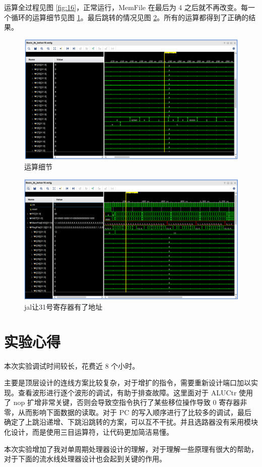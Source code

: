 \documentclass[a4paper,UTF8]{ctexart}
\begin{document}
运算全过程见图 \ref{fig:16}，正常运行，MemFile 在最后为 4 之后就不再改变。每一个循环的运算细节见图 \ref{fig:calcde}。最后跳转的情况见图 \ref{fig:cond}。所有的运算都得到了正确的结果。

\begin{figure}[H]
    \centering
    \includegraphics[width=\textwidth]{calcdetail.png}
    \caption{运算细节}
    \label{fig:calcde}
\end{figure}

\begin{figure}[H]
    \centering
    \includegraphics[width=\textwidth]{memdetail.png}
    \caption{jal让31号寄存器有了地址}
    \label{fig:cond}
\end{figure}

\section{实验心得}

本次实验调试时间较长，花费近 8 个小时。

主要是顶层设计的连线方案比较复杂，对于增扩的指令，需要重新设计端口加以实现。查看波形进行逐个波形的调试，有助于排查故障。这里面对于 ALUCtr 使用了 nop 扩增非常关键，否则会导致空指令执行了某些移位操作导致 0 寄存器非零，从而影响下面数据的读取。对于 PC 的写入顺序进行了比较多的调试，最后确定了上跳沿递增、下跳沿跳转的方案，可以互不干扰。并且选路器没有采用模块化设计，而是使用三目运算符，让代码更加简洁易懂。

本次实验增加了我对单周期处理器设计的理解，对于理解一些原理有很大的帮助，对于下面的流水线处理器设计也会起到关键的作用。
\end{document}
